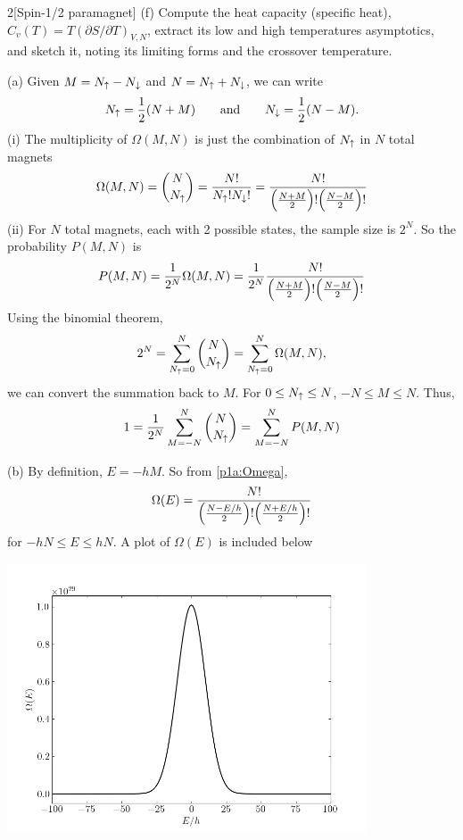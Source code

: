 \documentclass[12pt]{article}
\begin{document}
\begin{problem}{2}[Spin-1/2 paramagnet]
(f) Compute the heat capacity (specific heat), $C_v(T)=T(\partial S/\partial
T)_{V,N}$, extract its low and high temperatures asymptotics, and sketch it,
noting its limiting forms and the crossover temperature.
\begin{solution}
(a) Given $M=N_\uparrow-N_\downarrow$ and $N=N_\uparrow+N_\downarrow$, we can write
\begin{equation}
    N_\uparrow=\frac12\qty(N+M)\qquad\text{and}\qquad
    N_\downarrow=\frac12\qty(N-M).
\end{equation}
(i) The multiplicity of $\Omega(M,N)$ is just the combination of $N_\uparrow$ in $N$
total magnets
\begin{equation}\label{p1a:Omega}
    \Omega(M,N)=\binom{N}{N_\uparrow}=\frac{N!}{N_\uparrow!N_\downarrow!}
    =\frac{N!}{\qty(\frac{N+M}{2})!\qty(\frac{N-M}{2})!}
\end{equation}
(ii) For $N$ total magnets, each with 2 possible states, the sample size is
$2^N$. So the probability $P(M,N)$ is
\begin{equation}
    P(M,N)
    =\frac1{2^N}\Omega(M,N)
    =\frac1{2^N}\frac{N!}{\qty(\frac{N+M}{2})!\qty(\frac{N-M}{2})!} 
\end{equation}
Using the binomial theorem,
\begin{equation}
    2^N=\sum_{N_\uparrow=0}^N\binom{N}{N_\uparrow}=\sum_{N_\uparrow=0}^N\Omega(M,N),
\end{equation}
we can convert the summation back to $M$. For $0\leq N_\uparrow\leq N$, $-N\leq M\leq
N$. Thus,
\begin{equation}
    1=\frac1{2^N}\sum_{M=-N}^N\binom{N}{N_\uparrow}=\sum_{M=-N}^NP(M,N)
\end{equation}

(b) By definition, $E=-hM$. So from \eqref{p1a:Omega},
\begin{equation}
    \Omega(E)=\frac{N!}{\qty(\frac{N-E/h}{2})!\qty(\frac{N+E/h}{2})!}
\end{equation}
for $-hN\leq E\leq hN$. A plot of $\Omega(E)$ is included below
\begin{center}
    \includegraphics[width=0.8\textwidth]{p1b.png} 
\end{center}


\end{solution}
\end{problem}
\end{document}
